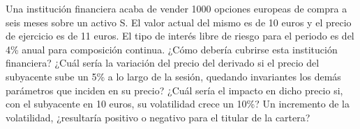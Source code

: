 \begin{problem}[4]
Una institución financiera acaba de vender 1000 opciones europeas de compra a seis meses sobre
un activo S. El valor actual del mismo es de 10 euros y el precio de ejercicio es de 11 euros. El tipo
de interés libre de riesgo para el periodo es del 4\% anual para composición continua.
\ppart ¿Cómo debería cubrirse esta institución financiera?
\ppart ¿Cuál sería la variación del precio del derivado si el precio del subyacente sube un 5\% a lo largo de la sesión, quedando invariantes los demás parámetros que inciden en su precio?
\ppart ¿Cuál sería el impacto en dicho precio si, con el subyacente en 10 euros, su volatilidad crece un 10\%?
\ppart Un incremento de la volatilidad, ¿resultaría positivo o negativo para el titular de la cartera?
\solution

\end{problem}

